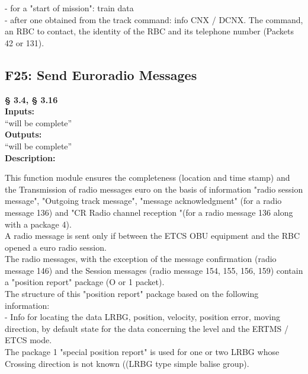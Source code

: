 \documentclass{template/openetcs_report}
\begin{document}
- for a "start of mission": train data \\

- after one obtained from the track command: info CNX / DCNX. 
The command, an RBC to contact, the identity of the RBC and its telephone number 
(Packets 42 or 131).\\



 \subsection{F25: Send Euroradio Messages}
 \textbf{§ 3.4, § 3.16}\\
 
  \textbf{Inputs:}\\
``will be complete''\\

 \textbf{Outputs:}\\
 ``will be complete''\\
 
\textbf{Description:} 

This function module ensures the completeness (location and time stamp) and the 
Transmission of radio messages euro on the basis of information "radio session message", 
"Outgoing track message", "message acknowledgment" (for a radio message 136) and "CR 
Radio channel reception "(for a radio message 136 along with a package 4). \\

A radio message is sent only if between the ETCS OBU equipment and the 
RBC opened a euro radio session. \\

The radio messages, with the exception of the message confirmation (radio message 146) and the 
Session messages (radio message 154, 155, 156, 159) contain a "position report" package 
(O or 1 packet). \\

The structure of this "position report" package based on the following information: \\

- Info for locating the data LRBG, position, velocity, position error, moving direction,
by default state for the data concerning the level and the ERTMS / ETCS mode. \\

The package 1 "special position report" is used for one or two LRBG whose 
Crossing direction is not known ((LRBG type simple balise group). \\
\end{document}
